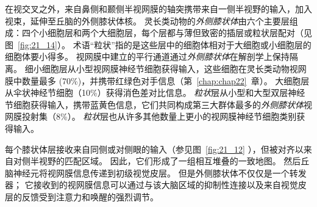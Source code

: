 在视交叉之外，来自鼻侧和颞侧半视网膜的轴突携带来自一侧半视野的输入，加入视束，延伸至丘脑的外侧膝状体核。
灵长类动物的\textit{外侧膝状体}由六个主要层组成：四个小细胞层和两个大细胞层，每个层都与薄但致密的插层或粒状层配对（见图~\ref{fig:21_14}）。
术语“粒状”指的是这些层中的细胞体相对于大细胞或小细胞层的细胞体要小得多。
视网膜中建立的平行通道通过\textit{外侧膝状体}在解剖学上保持隔离。
细小细胞层从小型视网膜神经节细胞获得输入，这些细胞在灵长类动物视网膜中数量最多 (70\%)，并携带红绿色对手信息（第~\ref{chap:chap22}~章）。
大细胞层从伞状神经节细胞（10\%）获得消色差对比信息。
\textit{粒状}层从小型和大型双层神经节细胞获得输入，携带蓝黄色信息，它们共同构成第三大群体最多的\textit{外侧膝状体}视网膜投射集（8\%）。
\textit{粒状}层也从许多其他数量上更小的视网膜神经节细胞类别获得输入。


每个膝状体层接收来自同侧或对侧眼的输入（参见图~\ref{fig:21_12} ），但被对齐以来自对侧半视野的匹配区域。
因此，它们形成了一组相互堆叠的一致地图。
然后丘脑神经元将视网膜信息传递到初级视觉皮层。
但是外侧膝状体不仅仅是一个转发器；
它接收到的视网膜信息可以通过与该大脑区域的抑制性连接以及来自视觉皮层的反馈受到注意力和唤醒的强烈调节。


